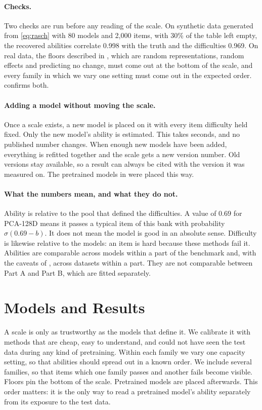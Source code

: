 \documentclass[]{style}
\begin{document}
\paragraph{Checks.}
Two checks are run before any reading of the scale. On synthetic data generated from
\cref{eq:rasch} with 80 models and 2,000 items, with 30\% of the table left empty, the
recovered abilities correlate 0.998 with the truth and the difficulties 0.969. On real
data, the floors described in , which are random representations, random
effects and predicting no change, must come out at the bottom of the scale, and every
family in which we vary one setting must come out in the expected order. 
confirms both.

\paragraph{Adding a model without moving the scale.}
Once a scale exists, a new model is placed on it with every item difficulty held fixed.
Only the new model's ability is estimated. This takes seconds, and no published number
changes. When enough new models have been added, everything is refitted together and the
scale gets a new version number. Old versions stay available, so a result can always be
cited with the version it was measured on. The pretrained models in  were
placed this way.

\paragraph{What the numbers mean, and what they do not.}
Ability is relative to the pool that defined the difficulties. A value of $0.69$ for
PCA-128D means it passes a typical item of this bank with probability $\sigma(0.69-b)$.
It does not mean the model is good in an absolute sense. Difficulty is likewise relative
to the models: an item is hard because these methods fail it. Abilities are comparable
across models within a part of the benchmark and, with the caveats of ,
across datasets within a part. They are not comparable between Part A and Part B, which
are fitted separately.

\section{Models and Results}
\label{sec:eval}

A scale is only as trustworthy as the models that define it. We calibrate it with methods
that are cheap, easy to understand, and could not have seen the test data during any kind
of pretraining. Within each family we vary one capacity setting, so that abilities should
spread out in a known order. We include several families, so that items which one family
passes and another fails become visible. Floors pin the bottom of the scale. Pretrained
models are placed afterwards. This order matters: it is the only way to read a pretrained
model's ability separately from its exposure to the test data.
\end{document}
